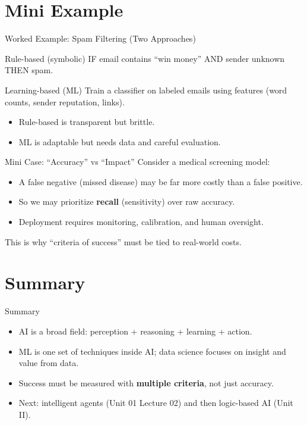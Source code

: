 \documentclass[aspectratio=169]{beamer}
\begin{document}
\section{Mini Example}
\label{sec:example}

\begin{frame}{Worked Example: Spam Filtering (Two Approaches)}
  \begin{block}{Rule-based (symbolic)}
    IF email contains ``win money'' AND sender unknown THEN spam.
  \end{block}
  \vspace{0.4em}
  \begin{block}{Learning-based (ML)}
    Train a classifier on labeled emails using features (word counts, sender reputation, links).
  \end{block}
  \vspace{0.4em}
  \begin{itemize}
    \item Rule-based is transparent but brittle.
    \item ML is adaptable but needs data and careful evaluation.
  \end{itemize}
\end{frame}

\begin{frame}{Mini Case: ``Accuracy'' vs ``Impact''}
  Consider a medical screening model:
  \begin{itemize}[<+->]
    \item A false negative (missed disease) may be far more costly than a false positive.
    \item So we may prioritize \textbf{recall} (sensitivity) over raw accuracy.
    \item Deployment requires monitoring, calibration, and human oversight.
  \end{itemize}
  \vspace{0.4em}
  This is why ``criteria of success'' must be tied to real-world costs.
\end{frame}

\section{Summary}
\label{sec:summary}

\begin{frame}{Summary}
  \begin{itemize}
    \item AI is a broad field: perception + reasoning + learning + action.
    \item ML is one set of techniques inside AI; data science focuses on insight and value from data.
    \item Success must be measured with \textbf{multiple criteria}, not just accuracy.
    \item Next: intelligent agents (Unit 01 Lecture 02) and then logic-based AI (Unit II).
  \end{itemize}
  \slidesources{\AIMLUnitISources}
\end{frame}
\end{document}
